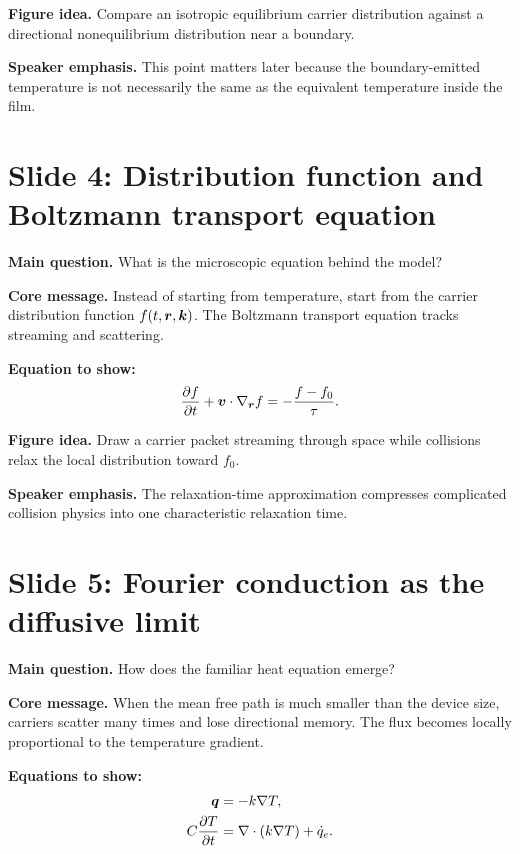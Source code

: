 \documentclass[11pt]{article}
\begin{document}
\textbf{Figure idea.} Compare an isotropic equilibrium carrier distribution against a directional nonequilibrium distribution near a boundary.

\textbf{Speaker emphasis.} This point matters later because the boundary-emitted temperature is not necessarily the same as the equivalent temperature inside the film.

\section{Slide 4: Distribution function and Boltzmann transport equation}
\begin{physicsbox}
\textbf{Main question.} What is the microscopic equation behind the model?
\end{physicsbox}

\textbf{Core message.} Instead of starting from temperature, start from the carrier distribution function \(f(t,\bm{r},\bm{k})\). The Boltzmann transport equation tracks streaming and scattering.

\textbf{Equation to show:}
\begin{equation*}
\frac{\partial f}{\partial t}+\bm{v}\cdot\nabla_{\bm{r}} f=-\frac{f-f_0}{\tau}.
\end{equation*}

\textbf{Figure idea.} Draw a carrier packet streaming through space while collisions relax the local distribution toward \(f_0\).

\textbf{Speaker emphasis.} The relaxation-time approximation compresses complicated collision physics into one characteristic relaxation time.

\section{Slide 5: Fourier conduction as the diffusive limit}
\begin{physicsbox}
\textbf{Main question.} How does the familiar heat equation emerge?
\end{physicsbox}

\textbf{Core message.} When the mean free path is much smaller than the device size, carriers scatter many times and lose directional memory. The flux becomes locally proportional to the temperature gradient.

\textbf{Equations to show:}
\begin{align*}
\bm{q}&=-k\nabla T,\\
C\frac{\partial T}{\partial t}&=\nabla\cdot(k\nabla T)+\dot{q}_e.
\end{align*}
\end{document}
